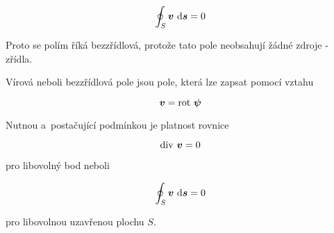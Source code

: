 \begin{equation}
\oint_{S} \boldsymbol{v} \ \mathrm{d}\boldsymbol{s} = 0
\end{equation}

Proto se polím říká bezzřídlová, protože tato pole neobsahují žádné zdroje - zřídla.

\begin{fact}
Vírová neboli bezzřídlová pole jsou pole, která lze zapsat pomocí vztahu

\begin{equation}
\vect{v} = \rot \ \vect{\psi}
\end{equation}

Nutnou a~postačující podmínkou je platnost rovnice

\begin{equation}
\mathrm{div} \ \boldsymbol{v} = 0
\end{equation} 

pro libovolný bod neboli

\begin{equation}
\oint_{S} \boldsymbol{v} \ \mathrm{d}\boldsymbol{s} = 0
\end{equation}

pro libovolnou uzavřenou plochu \(S\).
\end{fact}
